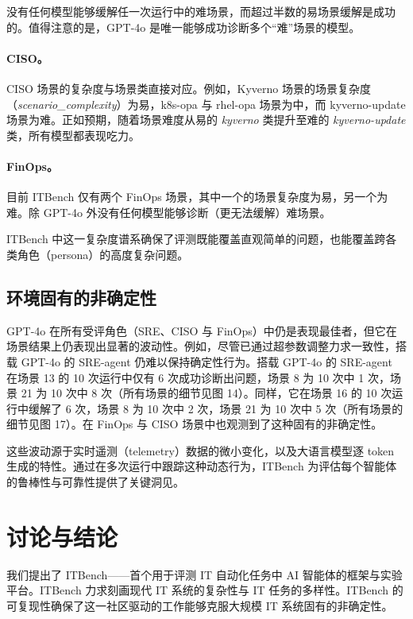 \documentclass[10pt,UTF8,fontset=fandol]{ctexart}
\begin{document}
没有任何模型能够缓解任一次运行中的难场景，而超过半数的易场景缓解是成功的。值得注意的是，GPT-4o 是唯一能够成功诊断多个“难”场景的模型。

\paragraph{CISO。} CISO 场景的复杂度与场景类直接对应。例如，Kyverno 场景的场景复杂度（\textit{scenario\_complexity}）为易，k8s-opa 与 rhel-opa 场景为中，而 kyverno-update 场景为难。正如预期，随着场景难度从易的 \textit{kyverno} 类提升至难的 \textit{kyverno-update} 类，所有模型都表现吃力。

\paragraph{FinOps。} 目前 ITBench 仅有两个 FinOps 场景，其中一个的场景复杂度为易，另一个为难。除 GPT-4o 外没有任何模型能够诊断（更无法缓解）难场景。

ITBench 中这一复杂度谱系确保了评测既能覆盖直观简单的问题，也能覆盖跨各类角色（persona）的高度复杂问题。

\subsection{环境固有的非确定性}

GPT-4o 在所有受评角色（SRE、CISO 与 FinOps）中仍是表现最佳者，但它在场景结果上仍表现出显著的波动性。例如，尽管已通过超参数调整力求一致性，搭载 GPT-4o 的 SRE-agent 仍难以保持确定性行为。搭载 GPT-4o 的 SRE-agent 在场景 13 的 10 次运行中仅有 6 次成功诊断出问题，场景 8 为 10 次中 1 次，场景 21 为 10 次中 8 次（所有场景的细节见图 14）。同样，它在场景 16 的 10 次运行中缓解了 6 次，场景 8 为 10 次中 2 次，场景 21 为 10 次中 5 次（所有场景的细节见图 17）。在 FinOps 与 CISO 场景中也观测到了这种固有的非确定性。

这些波动源于实时遥测（telemetry）数据的微小变化，以及大语言模型逐 token 生成的特性。通过在多次运行中跟踪这种动态行为，ITBench 为评估每个智能体的鲁棒性与可靠性提供了关键洞见。

\section{讨论与结论}

我们提出了 ITBench——首个用于评测 IT 自动化任务中 AI 智能体的框架与实验平台。ITBench 力求刻画现代 IT 系统的复杂性与 IT 任务的多样性。ITBench 的可复现性确保了这一社区驱动的工作能够克服大规模 IT 系统固有的非确定性。
\end{document}
